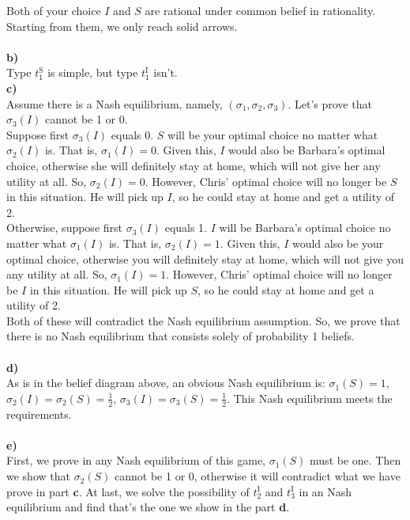 \documentclass{article}
\begin{document}
\begin{description}
\begin{center}
\begin{tabular}{cl}
        \hline
        \hline
        \end{tabular}
    \end{center}
    Both of your choice $I$ and $S$ are rational under common belief in rationality. Starting from them, we only reach solid arrows.\\\\
    {\bf b)}\\
    Type $t_1^{\text{S}}$ is simple, but type $t_1^{\text{I}}$ isn't.\\\newpage
    {\bf c)}\\
    Assume there is a Nash equilibrium, namely, $\left(\sigma _1,\sigma _2,\sigma _3\right)$. Let's prove that $\sigma _3(I)$ cannot be 1 or 0.\\
    Suppose first $\sigma _3(I)$ equals 0. $S$ will be your optimal choice no matter what $\sigma _2(I)$ is. That is, $\sigma _1(I)=0$. Given this, $I$ would also be Barbara's optimal choice, otherwise she will definitely stay at home, which will not give her any utility at all. So, $\sigma _2(I)=0$. However, Chris' optimal choice will no longer be $S$ in this situation. He will pick up $I$, so he could stay at home and get a utility of 2.\\
    Otherwise, suppose first $\sigma _3(I)$ equals 1. $I$ will be Barbara's optimal choice no matter what $\sigma _1(I)$ is. That is, $\sigma _2(I)=1$. Given this, $I$ would also be your optimal choice, otherwise you will definitely stay at home, which will not give you any utility at all. So, $\sigma _1(I)=1$. However, Chris' optimal choice will no longer be $I$ in this situation. He will pick up $S$, so he could stay at home and get a utility of 2.\\
    Both of these will contradict the Nash equilibrium assumption. So, we prove that there is no Nash equilibrium that consists solely of probability 1 beliefs.\\\\
    {\bf d)}\\
    As is in the belief diagram above, an obvious Nash equilibrium is:
    $\sigma _1(S)=1$, $\sigma _2(I)=\sigma _2(S)=\frac{1}{2}$, $\sigma _3(I)=\sigma _3(S)=\frac{1}{2}$. This Nash equilibrium meets the requirements.\\\\
    {\bf e)}\\
    First, we prove in any Nash equilibrium of this game, $\sigma _1(S)$ must be one. Then we show that $\sigma _2(S)$ cannot be 1 or 0, otherwise it will contradict what we have prove in part {\bf c}. At last, we solve the possibility of $t_2^{\text{I}}$ and $t_3^{\text{I}}$ in an Nash equilibrium and find that's the one we show in the part {\bf d}.\\

\end{description}
\end{document}
